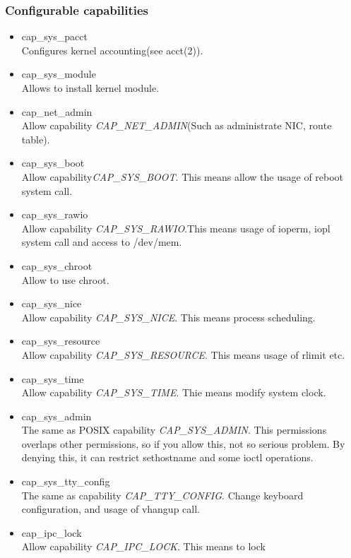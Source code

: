 \documentclass{article}
\begin{document}
\subsubsection{Configurable capabilities}
\begin{itemize}
 \item cap\_sys\_pacct\\
       Configures kernel accounting(see acct(2)).
 \item cap\_sys\_module\\
       Allows to install kernel module.
 \item cap\_net\_admin\\
       Allow capability {\it CAP\_NET\_ADMIN}(Such as 
       administrate NIC, route table). 
 \item cap\_sys\_boot\\
       Allow capability{\it CAP\_SYS\_BOOT}. This means allow the
       usage of reboot system call.
 \item cap\_sys\_rawio\\        
       Allow capability {\it CAP\_SYS\_RAWIO}.This means usage of
       ioperm, iopl system call and access to /dev/mem.
 \item cap\_sys\_chroot\\
       Allow to use chroot.
 \item cap\_sys\_nice\\
       Allow capability {\it CAP\_SYS\_NICE}. This means process scheduling.
 \item cap\_sys\_resource\\
       Allow capability {\it CAP\_SYS\_RESOURCE}. This means usage
       of rlimit etc.
 \item cap\_sys\_time\\
       Allow capability {\it CAP\_SYS\_TIME}. Thie means modify
       system clock.
 \item cap\_sys\_admin\\
       The same as POSIX capability {\it CAP\_SYS\_ADMIN}. This
       permissions overlaps other permissions, so if you allow
       this, not so serious problem. By denying this,
       it can restrict sethostname and some ioctl operations.
 \item cap\_sys\_tty\_config\\
       The same as capability {\it CAP\_TTY\_CONFIG}. Change
       keyboard configuration, and usage of vhangup call. 
 \item cap\_ipc\_lock\\ 
       Allow capability {\it CAP\_IPC\_LOCK}. This means to lock

\end{itemize}
\end{document}
